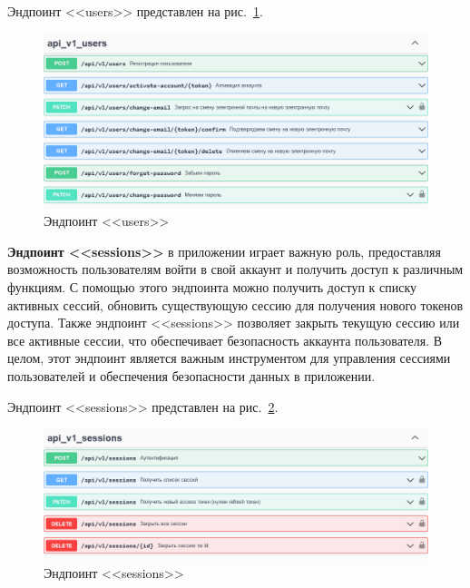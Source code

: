 Эндпоинт <<users>> представлен на рис.~\ref{fig:swagger_users}.

\begin{figure}[!p]
    \centering

    \includegraphics[width=12cm]
    {images/swagger/users.png}

    \caption{Эндпоинт <<users>>}

    \label{fig:swagger_users}
\end{figure}

\textbf{Эндпоинт <<sessions>>} в приложении играет важную роль,
предоставляя возможность пользователям войти в свой аккаунт и получить доступ к различным функциям.
С помощью этого эндпоинта можно получить доступ к списку активных сессий,
обновить существующую сессию для получения нового токенов доступа.
Также эндпоинт <<sessions>> позволяет закрыть текущую сессию или все активные сессии,
что обеспечивает безопасность аккаунта пользователя.
В целом, этот эндпоинт является важным инструментом для управления сессиями пользователей и обеспечения безопасности данных в приложении.

Эндпоинт <<sessions>> представлен на рис.~\ref{fig:swagger_sessions}.

\begin{figure}[!p]
    \centering

    \includegraphics[width=12cm]
    {images/swagger/sessions.png}

    \caption{Эндпоинт <<sessions>>}

    \label{fig:swagger_sessions}
\end{figure}

